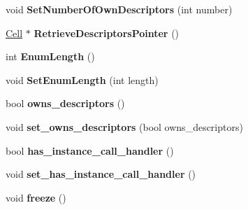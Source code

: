 \begin{DoxyCompactItemize}
\item 
\hypertarget{classv8_1_1internal_1_1_map_a6dcbe6ad0bd9b7e7db9e4b8d0c9c10c3}{}void {\bfseries Set\+Number\+Of\+Own\+Descriptors} (int number)\label{classv8_1_1internal_1_1_map_a6dcbe6ad0bd9b7e7db9e4b8d0c9c10c3}

\item 
\hypertarget{classv8_1_1internal_1_1_map_a0b8b0aaeb7369127735a934852770063}{}\hyperlink{classv8_1_1internal_1_1_cell}{Cell} $\ast$ {\bfseries Retrieve\+Descriptors\+Pointer} ()\label{classv8_1_1internal_1_1_map_a0b8b0aaeb7369127735a934852770063}

\item 
\hypertarget{classv8_1_1internal_1_1_map_a138e7b0b2cc5cd43f507de3896368a27}{}int {\bfseries Enum\+Length} ()\label{classv8_1_1internal_1_1_map_a138e7b0b2cc5cd43f507de3896368a27}

\item 
\hypertarget{classv8_1_1internal_1_1_map_a09932f1a95aa75946acba84a0c90678a}{}void {\bfseries Set\+Enum\+Length} (int length)\label{classv8_1_1internal_1_1_map_a09932f1a95aa75946acba84a0c90678a}

\item 
\hypertarget{classv8_1_1internal_1_1_map_ab149097973d68fd9ceddfa1465036b97}{}bool {\bfseries owns\+\_\+descriptors} ()\label{classv8_1_1internal_1_1_map_ab149097973d68fd9ceddfa1465036b97}

\item 
\hypertarget{classv8_1_1internal_1_1_map_ade071f606085fe8a7fb585325da9a7a5}{}void {\bfseries set\+\_\+owns\+\_\+descriptors} (bool owns\+\_\+descriptors)\label{classv8_1_1internal_1_1_map_ade071f606085fe8a7fb585325da9a7a5}

\item 
\hypertarget{classv8_1_1internal_1_1_map_a695be08fd59cd7fac657fe07394a1fcf}{}bool {\bfseries has\+\_\+instance\+\_\+call\+\_\+handler} ()\label{classv8_1_1internal_1_1_map_a695be08fd59cd7fac657fe07394a1fcf}

\item 
\hypertarget{classv8_1_1internal_1_1_map_a98b48fe1d6f9e896bd16899938ee6d9b}{}void {\bfseries set\+\_\+has\+\_\+instance\+\_\+call\+\_\+handler} ()\label{classv8_1_1internal_1_1_map_a98b48fe1d6f9e896bd16899938ee6d9b}

\item 
\hypertarget{classv8_1_1internal_1_1_map_ae94289268a691e2e2ecf8f92ff585c20}{}void {\bfseries freeze} ()\label{classv8_1_1internal_1_1_map_ae94289268a691e2e2ecf8f92ff585c20}


\end{DoxyCompactItemize}
